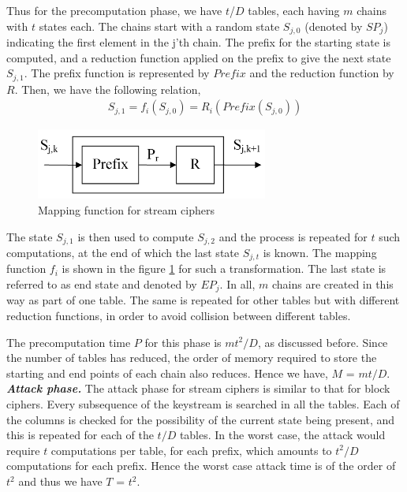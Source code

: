 Thus for the precomputation phase, we have $t$/$D$ tables, each having $m$ chains with $t$ states each. The chains start with a random state $S_{j,0}$ (denoted by $SP_j$) indicating the first element in the j'th chain. The prefix for the starting state is computed, and a reduction function applied on the prefix to give the next state $S_{j,1}$. The prefix function is represented by $Prefix$ and the reduction function by $R$. Then, we have the following relation,
\begin{align*}
S_{j,1} = f_i(S_{j,0}) = R_i(Prefix(S_{j,0}))
\end{align*}  
\begin{figure}[ht!]
	\centering
		\includegraphics[width=3in]{./figures/mapping-function-stream.PNG}
	\caption{Mapping function for stream ciphers}	
	\label{fig:mapping-function-stream}
\end{figure}

The state $S_{j,1}$ is then used to compute $S_{j,2}$ and the process is repeated for $t$ such computations, at the end of which the last state $S_{j,t}$ is known. The mapping function $f_i$ is shown in the figure \ref{fig:mapping-function-stream} for such a transformation. The last state is referred to as end state and denoted by $EP_j$. In all, $m$ chains are created in this way as part of one table. The same is repeated for other tables but with different reduction functions, in order to avoid collision between different tables. 

The precomputation time $P$ for this phase is $mt^2/D$, as discussed before. Since the number of tables has reduced, the order of memory required to store the starting and end points of each chain also reduces. Hence we have, $M$ = $mt/D$.\\

\noindent \textit{\textbf{Attack phase.}} The attack phase for stream ciphers is similar to that for block ciphers. Every subsequence of the keystream is searched in all the tables. Each of the columns is checked for the possibility of the current state being present, and this is repeated for each of the $t/D$ tables. In the worst case, the attack would require $t$ computations per table, for each prefix, which amounts to $t^2/D$ computations for each prefix. Hence the worst case attack time is of the order of $t^2$ and thus we have $T$ = $t^2$.\\

